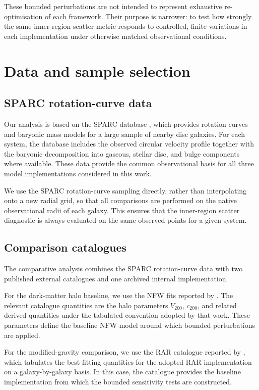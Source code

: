 \documentclass[fleqn,usenatbib]{mnras}
\begin{document}
These bounded perturbations are not intended to represent exhaustive
re-optimisation of each framework. Their purpose is narrower: to test
how strongly the same inner-region scatter metric responds to
controlled, finite variations in each implementation under otherwise
matched observational conditions.

\section{Data and sample selection}
\label{sec:data}

\subsection{SPARC rotation-curve data}
\label{subsec:sparc_data}

Our analysis is based on the SPARC database \citep{Lelli2016}, which
provides rotation curves and baryonic mass models for a large sample of
nearby disc galaxies. For each system, the database includes the
observed circular velocity profile together with the baryonic
decomposition into gaseous, stellar disc, and bulge components where
available. These data provide the common observational basis for all
three model implementations considered in this work.

We use the SPARC rotation-curve sampling directly, rather than
interpolating onto a new radial grid, so that all comparisons are
performed on the native observational radii of each galaxy. This
ensures that the inner-region scatter diagnostic is always evaluated on
the same observed points for a given system.

\subsection{Comparison catalogues}
\label{subsec:comparison_catalogues}

The comparative analysis combines the SPARC rotation-curve data with
two published external catalogues and one archived internal
implementation.

For the dark-matter halo baseline, we use the NFW fits reported by
\citet{Li2020}. The relevant catalogue quantities are the halo
parameters $V_{200}$, $c_{200}$, and related derived quantities under
the tabulated convention adopted by that work. These parameters define
the baseline NFW model around which bounded perturbations are applied.

For the modified-gravity comparison, we use the RAR catalogue reported
by \citet{Li2020}, which tabulates the best-fitting quantities for the
adopted RAR implementation on a galaxy-by-galaxy basis. In this case,
the catalogue provides the baseline implementation from which the
bounded sensitivity tests are constructed.
\end{document}

